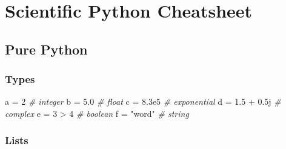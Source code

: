 \documentclass[]{article}
\author{}
\date{}
\newenvironment{Shaded}{}{}
\newcommand{\DecValTok}[1]{\textcolor[rgb]{0.25,0.63,0.44}{{#1}}}
\newcommand{\FloatTok}[1]{\textcolor[rgb]{0.25,0.63,0.44}{{#1}}}
\newcommand{\StringTok}[1]{\textcolor[rgb]{0.25,0.44,0.63}{{#1}}}
\newcommand{\CommentTok}[1]{\textcolor[rgb]{0.38,0.63,0.69}{\textit{{#1}}}}
\newcommand{\OtherTok}[1]{\textcolor[rgb]{0.00,0.44,0.13}{{#1}}}
\newcommand{\NormalTok}[1]{{#1}}
\begin{document}
\section{Scientific Python Cheatsheet}

\subsection{Pure Python}

\subsubsection{Types}

\begin{Shaded}
\begin{Highlighting}[]
\NormalTok{a = }\DecValTok{2} \CommentTok{# integer}
\NormalTok{b = }\FloatTok{5.0} \CommentTok{# float}
\NormalTok{c = }\FloatTok{8.3e5} \CommentTok{# exponential}
\NormalTok{d = }\FloatTok{1.5} \NormalTok{+}\OtherTok{ 0.5j} \CommentTok{# complex}
\NormalTok{e = }\DecValTok{3} \NormalTok{> }\DecValTok{4} \CommentTok{# boolean}
\NormalTok{f = }\StringTok{"word"} \CommentTok{# string}
\end{Highlighting}
\end{Shaded}

\subsubsection{Lists}
\end{document}
